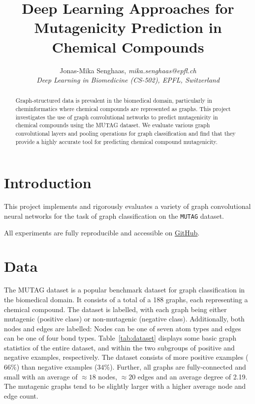\documentclass[10pt,conference,compsocconf]{IEEEtran}
\begin{document}
\title{Deep Learning Approaches for Mutagenicity Prediction in Chemical Compounds}

\author{
  Jonas-Mika Senghaas, \textit{mika.senghaas@epfl.ch} \\
  \textit{Deep Learning in Biomedicine (CS-502), EPFL, Switzerland}
}

\maketitle

\begin{abstract}

Graph-structured data is prevalent in the biomedical domain, particularly in
cheminformatics where chemical compounds are represented as graphs. This project
investigates the use of graph convolutional networks to predict mutagenicity in
chemical compounds using the MUTAG dataset. We evaluate various graph
convolutional layers and pooling operations for graph classification and find
that they provide a highly accurate tool for predicting chemical compound
mutagenicity.

\end{abstract}


\section{Introduction}

This project implements and rigorously evaluates a variety of graph
convolutional neural networks for the task of graph classification on the
\texttt{MUTAG} dataset. 

All experiments are fully reproducible and accessible on
\href{https://github.com/mikasenghaas/cs502}{GitHub}.

\section{Data}

The MUTAG dataset is a popular benchmark dataset for graph classification in the
biomedical domain. It consists of a total of a 188 graphs, each representing a
chemical compound. The dataset is labelled, with each graph being either
mutagenic (positive class) or non-mutagenic (negative class). Additionally, both
nodes and edges are labelled: Nodes can be one of seven atom types and edges can
be one of four bond types. Table~\ref{tab:dataset} displays some basic graph
statistics of the entire dataset, and within the two subgroups of positive and
negative examples, respectively. The dataset consists of more positive examples
($66\%$) than negative examples ($34\%$). Further, all graphs are
fully-connected and small with an average of $\approx 18$ nodes, $\approx 20$
edges and an average degree of 2.19. The mutagenic graphs tend to be slightly
larger with a higher average node and edge count. 
\end{document}
